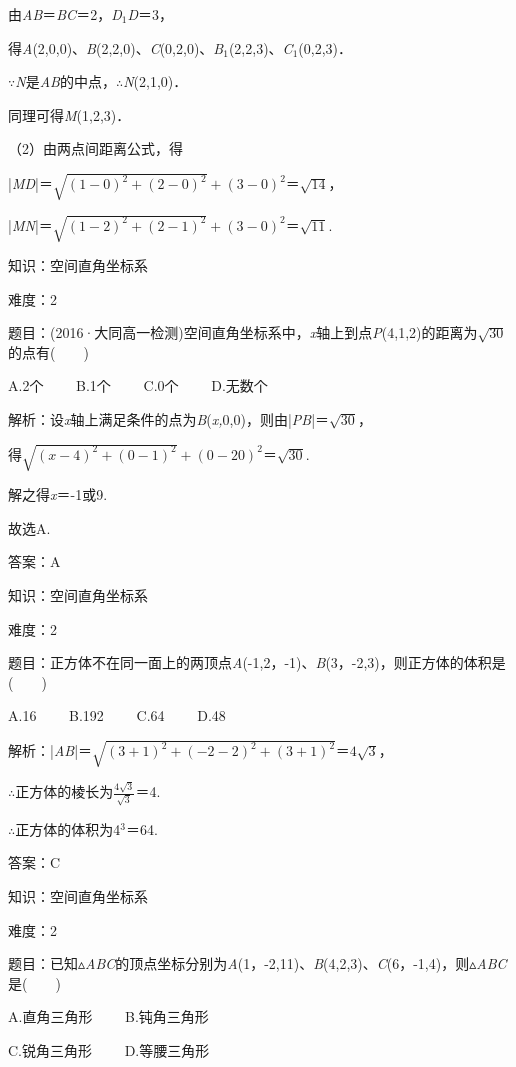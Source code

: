 \documentclass{article} %
\begin{document}
由\textit{AB}＝\textit{BC}＝2，\textit{D}${}_{1}$\textit{D}＝3，

得\textit{A}(2,0,0)、\textit{B}(2,2,0)、\textit{C}(0,2,0)、\textit{B}${}_{1}$(2,2,3)、\textit{C}${}_{1}$(0,2,3)．

$\mathrm{\because}$\textit{N}是\textit{AB}的中点，$\mathrm{\therefore}$\textit{N}(2,1,0)．

同理可得\textit{M}(1,2,3)．

（2）由两点间距离公式，得

|\textit{MD}|＝$\sqrt{(1-0)^2+(2-0)^2}+(3-0)^2$＝$\sqrt{14}$，

|\textit{MN}|＝$\sqrt{(1-2)^2+(2-1)^2}+(3-0)^2$＝$\sqrt{11}$.

知识：空间直角坐标系

难度：2

题目：(2016·大同高一检测)空间直角坐标系中，\textit{x}轴上到点\textit{P}(4,1,2)的距离为$\sqrt{30}$的点有(　　)

A.2个　　 B.1个　　 C.0个　　 D.无数个

解析：设\textit{x}轴上满足条件的点为\textit{B}(\textit{x,}0,0)，则由|\textit{PB}|＝$\sqrt{30}$，

得$\sqrt{(x-4)^2+(0-1)^2}+(0-20)^2$＝$\sqrt{30}$.

解之得\textit{x}＝-1或9.

故选A.

答案：A

知识：空间直角坐标系

难度：2

题目：正方体不在同一面上的两顶点\textit{A}(-1,2，-1)、\textit{B}(3，-2,3)，则正方体的体积是(　　)

A.16　　 B.192　　 C.64　　 D.48

解析：|\textit{AB}|＝$\sqrt{(3+1)^2+(-2-2)^2+(3+1)^2}$＝$4\sqrt{3}$，

$\mathrm{\therefore}$正方体的棱长为$\frac{4\sqrt{3}}{\sqrt{3}}$＝4.

$\mathrm{\therefore}$正方体的体积为4${}^{3}$＝64.

答案：C

知识：空间直角坐标系

难度：2

题目：已知$\mathrm{\vartriangle}$\textit{ABC}的顶点坐标分别为\textit{A}(1，-2,11)、\textit{B}(4,2,3)、\textit{C}(6，-1,4)，则$\mathrm{\vartriangle}$\textit{ABC}是(　　)

A.直角三角形　　 B.钝角三角形

C.锐角三角形　　 D.等腰三角形
\end{document}
